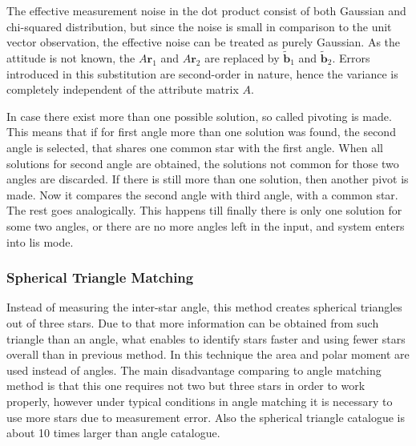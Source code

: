 \documentclass[12pt,a4paper,twoside]{article}
\begin{document}
The effective measurement noise in the dot product consist of both Gaussian and chi-squared distribution, but since the noise is small in comparison to the unit vector observation, the effective noise can be treated as purely Gaussian. As the attitude is not known, the $A\bm{r}_1$ and $A\bm{r}_2$ are replaced by $\tilde{\bm{b}}_1$ and $\tilde{\bm{b}}_2$. Errors introduced in this substitution are second-order in nature, hence the variance is completely independent of the attribute matrix $A$.

In case there exist more than one possible solution, so called pivoting is made. This means that if for first angle more than one solution was found, the second angle is selected, that shares one common star with the first angle. When all solutions for second angle are obtained, the solutions not common for those two angles are discarded. If there is still more than one solution, then another pivot is made. Now it compares the second angle with third angle, with a common star. The rest goes analogically. This happens till finally there is only one solution for some two angles, or there are no more angles left in the input, and system enters into \gls{lis} mode.

\subsubsection{Spherical Triangle Matching}

Instead of measuring the inter-star angle, this method creates spherical triangles out of three stars. Due to that more information can be obtained from such triangle than an angle, what enables to identify stars faster and using fewer stars overall than in previous method. In this technique the area and polar moment are used instead of angles. The main disadvantage comparing to angle matching method is that this one requires not two but three stars in order to work properly, however under typical conditions in angle matching it is necessary to use more stars due to measurement error. Also the spherical triangle catalogue is about 10 times larger than angle catalogue\cite{cole2004fast}.
\end{document}
